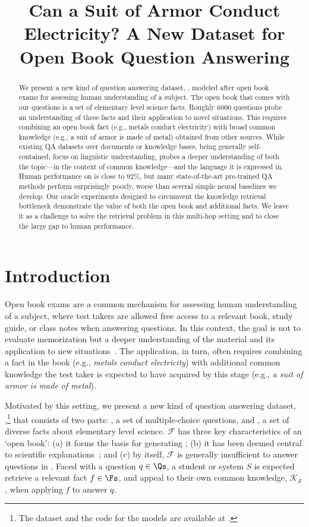 \title{Can a Suit of Armor Conduct Electricity? A New Dataset for Open Book Question Answering}

\begin{abstract}
We present a new kind of question answering dataset, \obqa, modeled after open book exams for assessing human understanding of a subject. The open book that comes with our questions is a set of \factsize elementary level science facts. Roughly 6000 questions probe an understanding of these facts and their application to novel situations. This requires combining an open book fact (e.g., metals conduct electricity) with broad common knowledge (e.g., a suit of armor is made of metal) obtained from other sources. While existing QA datasets over documents or knowledge bases, being generally self-contained, focus on linguistic understanding, \obqa probes a deeper understanding of both the topic---in the context of common knowledge---and the language it is expressed in. Human performance on \obqa is close to 92\%, but many state-of-the-art pre-trained QA methods perform surprisingly poorly, worse than several simple neural baselines we develop. Our oracle experiments designed to circumvent the knowledge retrieval bottleneck demonstrate the value of both the open book and additional facts. We leave it as a challenge to solve the retrieval problem in this multi-hop setting and to close the large gap to human performance.
\end{abstract}

\section{Introduction}
\label{sec:intro}

Open book exams are a common mechanism for assessing human understanding of a subject, where test takers are allowed free access to a relevant book, study guide, or class notes when answering questions. In this context, the goal is not to evaluate memorization but a deeper understanding of the material and its application to new situations~\cite{Jenkins1995OpenBA,Landsberger1996StudyGS}. The application, in turn, often requires combining a fact in the book (e.g., \emph{metals conduct electricity}) with additional common knowledge the test taker is expected to have acquired by this stage (e.g., \emph{a suit of armor is made of metal}).

Motivated by this setting, we present a new kind of question answering dataset, \obqa,\footnote{The dataset and the code for the models are available at \dataurl.} that consists of two parts: \Qs, a set of \fullsize multiple-choice questions, and \Fs, a set of \factsize diverse facts about elementary level science. $\mathcal{F}$ has three key characteristics of an `open book': (a) it forms the basis for generating \Qs; (b) it has been deemed central to scientific explanations~\cite{Jansen2018WorldTreeAC}; and (c) by itself, $\mathcal{F}$ is generally insufficient to answer questions in \Qs. Faced with a question $q \in \Qs$, a student or system $S$ is expected retrieve a relevant fact $f \in \Fs$, and appeal to their own common knowledge, $\mathcal{K_S}$, when applying $f$ to answer $q$.

